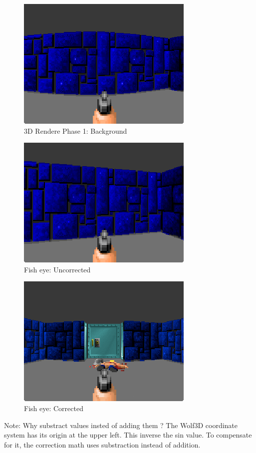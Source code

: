  

 







 \begin{figure}[H]
\centering
 \includegraphics[scale=1.3]{imgs/fish_eye/fish_eye.png}
 \caption{3D Rendere Phase 1: Background} \label{fig:mips}
 \end{figure}
 
 
  \begin{figure}[H]
\centering
 \includegraphics[scale=1.3]{imgs/fish_eye/fish_eye_corrected.png}
 \caption{Fish eye: Uncorrected} \label{fig:mips}
 \end{figure}
 
  \begin{figure}[H]
\centering
 \includegraphics[scale=1.3]{imgs/fish_eye/fish_eyed_start_screen2.png}
 \caption{Fish eye: Corrected} \label{fig:mips}
 \end{figure}
 Note: Why substract values insted of adding them ? The Wolf3D coordinate system has its origin at the upper left. This inverse the sin value. To compensate for it, the correction math uses substraction instead of addition.

